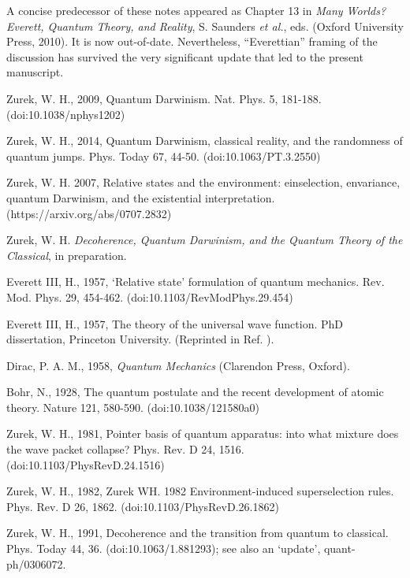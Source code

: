 \documentclass[aps,amsmath,amssymb,amsfonts,12pt]{revtex4-1}
\newcommand{\+}         {\dagger}
\begin{document}
{{{%

\begin{references}

 A concise predecessor of these notes appeared as Chapter 13 in {\it Many Worlds? Everett, Quantum Theory, and Reality}, S. Saunders {\it et al.}, eds. (Oxford University Press, 2010). It is now out-of-date. Nevertheless, ``Everettian'' framing of the discussion has survived the very significant update that led to the present manuscript.

 Zurek, W. H., 2009, Quantum Darwinism. Nat. Phys. 5, 181-188. (doi:10.1038/nphys1202)

 Zurek, W. H., 2014, Quantum Darwinism, classical reality, and the randomness of quantum jumps. Phys. Today 67, 44-50. (doi:10.1063/PT.3.2550)

 Zurek, W. H. 2007, Relative states and the environment: einselection, envariance, quantum Darwinism, and the existential interpretation. (https://arxiv.org/abs/0707.2832)

 Zurek, W. H. {\it Decoherence, Quantum Darwinism, and the Quantum Theory of the Classical}, in preparation.

 Everett III, H., 1957, `Relative state' formulation of quantum mechanics. Rev. Mod. Phys. 29,
454-462. (doi:10.1103/RevModPhys.29.454)

 Everett III, H., 1957, The theory of the universal wave function. PhD dissertation, Princeton
University. (Reprinted in Ref. \cite{22}).

 Dirac, P. A. M., 1958, {\it Quantum Mechanics} (Clarendon Press, Oxford).

 Bohr, N., 1928, The quantum postulate and the recent development of atomic theory. Nature
121, 580-590. (doi:10.1038/121580a0)

 Zurek, W. H., 1981, Pointer basis of quantum apparatus: into what mixture does the wave packet collapse? Phys. Rev. D 24, 1516. (doi:10.1103/PhysRevD.24.1516)

 Zurek, W. H., 1982, Zurek WH. 1982 Environment-induced superselection rules. Phys. Rev. D 26, 1862.
(doi:10.1103/PhysRevD.26.1862)

 Zurek, W. H., 1991, Decoherence and the transition from quantum to classical. Phys. Today 44, 36.
(doi:10.1063/1.881293); see also
an `update', quant-ph/0306072.


\end{references}}}}
\end{document}
